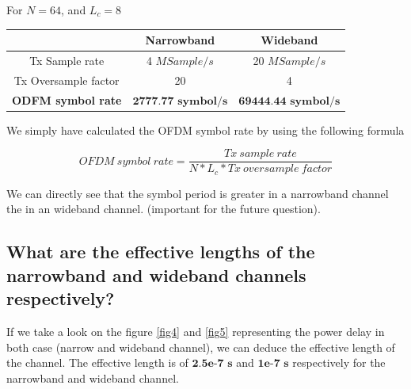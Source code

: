 \documentclass[frenchb, oneside, headings=normal]{scrartcl}
\begin{document}
For $N=64$, and $L_c=8$

\begin{center}
	\begin{tabular}{c|c|c}
		  & Narrowband & Wideband\\
		  \hline
	Tx Sample rate & 4 $MSample/s$ & 20 $MSample/s$ \\	  
	Tx Oversample factor & 20 & 4\\
	\textbf{ODFM symbol rate} &  $\textbf{2777.77 symbol/s}$ & $\textbf{69444.44 symbol/s}$ \\ 
	\end{tabular}
	\label{tab1}
\end{center}

We simply have calculated the OFDM symbol rate by using the following formula

\begin{equation}
OFDM~symbol~rate = \frac{Tx~sample~rate}{N*L_c*Tx~oversample~factor}
\end{equation}

We can directly see that the symbol period is greater in a narrowband channel the in an wideband channel. (important for the future question). 

\subsection{What are the effective lengths of the narrowband and wideband channels respectively?}

If we take a look on the figure \ref{fig4} and \ref{fig5} representing the power delay in both case (narrow and wideband channel), we can deduce the effective length of the channel. The effective length is of $\textbf{2.5e-7~s}$ and $\textbf{1e-7~s}$ respectively for the narrowband and wideband channel.
\end{document}
